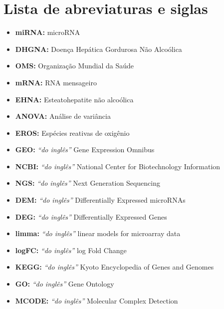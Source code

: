 \documentclass[12pt, a4paper]{article}
\begin{document}
    \listoffigures

    \listoftables

    \section*{Lista de abreviaturas e siglas}
    \begin{itemize}
        \item \textbf{miRNA:} microRNA
        \item \textbf{DHGNA:} Doença Hepática Gordurosa Não Alcoólica
        \item \textbf{OMS:} Organização Mundial da Saúde
        \item \textbf{mRNA:} RNA mensageiro
        \item \textbf{EHNA:} Esteatohepatite não alcoólica
        \item \textbf{ANOVA:} Análise de variância
        \item \textbf{EROS:} Espécies reativas de oxigênio
        \item \textbf{GEO:} \emph{“do inglês”} Gene Expression Omnibus
        \item \textbf{NCBI:} \emph{“do inglês”} National Center for Biotechnology Information
        \item \textbf{NGS:} \emph{“do inglês”} Next Generation Sequencing
        \item \textbf{DEM:} \emph{“do inglês”} Differentially Expressed microRNAs
        \item \textbf{DEG:} \emph{“do inglês”} Differentially Expressed Genes
        \item \textbf{limma:} \emph{“do inglês”} linear models for microarray data
        \item \textbf{logFC:} \emph{“do inglês”} log Fold Change
        \item \textbf{KEGG:} \emph{“do inglês”} Kyoto Encyclopedia of Genes and Genomes
        \item \textbf{GO:} \emph{“do inglês”} Gene Ontology
        \item \textbf{MCODE:} \emph{“do inglês”} Molecular Complex Detection
    \end{itemize}

    \tableofcontents
\end{document}
